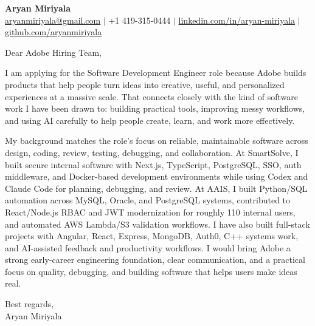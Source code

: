 \documentclass[11pt]{letter}
\begin{document}
\begin{center}
{\Large \textbf{Aryan Miriyala}}\\
\href{mailto:aryanmiriyala@gmail.com}{aryanmiriyala@gmail.com} $|$ +1 419-315-0444 $|$
\href{https://www.linkedin.com/in/aryan-miriyala-7788a21b6/}{linkedin.com/in/aryan-miriyala} $|$
\href{https://github.com/aryanmiriyala}{github.com/aryanmiriyala}
\end{center}

\vspace{0.25in}

Dear Adobe Hiring Team,

I am applying for the Software Development Engineer role because Adobe builds products that help people turn ideas into creative, useful, and personalized experiences at a massive scale. That connects closely with the kind of software work I have been drawn to: building practical tools, improving messy workflows, and using AI carefully to help people create, learn, and work more effectively.

My background matches the role's focus on reliable, maintainable software across design, coding, review, testing, debugging, and collaboration. At SmartSolve, I built secure internal software with Next.js, TypeScript, PostgreSQL, SSO, auth middleware, and Docker-based development environments while using Codex and Claude Code for planning, debugging, and review. At AAIS, I built Python/SQL automation across MySQL, Oracle, and PostgreSQL systems, contributed to React/Node.js RBAC and JWT modernization for roughly 110 internal users, and automated AWS Lambda/S3 validation workflows. I have also built full-stack projects with Angular, React, Express, MongoDB, Auth0, C++ systems work, and AI-assisted feedback and productivity workflows. I would bring Adobe a strong early-career engineering foundation, clear communication, and a practical focus on quality, debugging, and building software that helps users make ideas real.

\vspace{0.15in}

Best regards,\\
Aryan Miriyala
\end{document}
